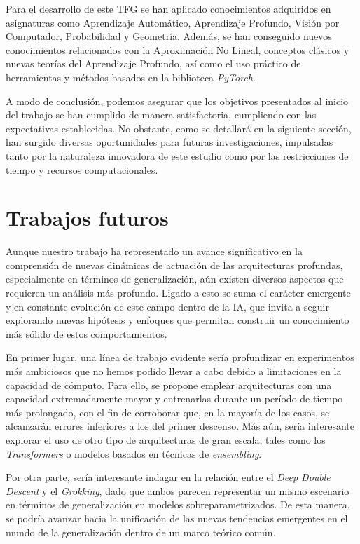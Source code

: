 Para el desarrollo de este TFG se han aplicado conocimientos adquiridos en asignaturas como Aprendizaje Automático, Aprendizaje Profundo, Visión por Computador, Probabilidad y Geometría. Además, se han conseguido nuevos conocimientos relacionados con la Aproximación No Lineal, conceptos clásicos y nuevas teorías del Aprendizaje Profundo, así como el uso práctico de herramientas y métodos basados en la biblioteca \textit{PyTorch}.

A modo de conclusión, podemos asegurar que los objetivos presentados al inicio del trabajo se han cumplido de manera satisfactoria, cumpliendo con las expectativas establecidas. No obstante, como se detallará en la siguiente sección, han surgido diversas oportunidades para futuras investigaciones, impulsadas tanto por la naturaleza innovadora de este estudio como por las restricciones de tiempo y recursos computacionales.

\chapter{Trabajos futuros}\label{ch:trabajos-futuros}

Aunque nuestro trabajo ha representado un avance significativo en la comprensión de nuevas dinámicas de actuación de las arquitecturas profundas, especialmente en términos de generalización, aún existen diversos aspectos que requieren un análisis más profundo. Ligado a esto se suma el carácter emergente y en constante evolución de este campo dentro de la IA, que invita a seguir explorando nuevas hipótesis y enfoques que permitan construir un conocimiento más sólido de estos comportamientos.

En primer lugar, una línea de trabajo evidente sería profundizar en experimentos más ambiciosos que no hemos podido llevar a cabo debido a limitaciones en la capacidad de cómputo. Para ello, se propone emplear arquitecturas con una capacidad extremadamente mayor y entrenarlas durante un período de tiempo más prolongado, con el fin de corroborar que, en la mayoría de los casos, se alcanzarán errores inferiores a los del primer descenso. Más aún, sería interesante explorar el uso de otro tipo de arquitecturas de gran escala, tales como los \textit{Transformers} o modelos basados en técnicas de \textit{ensembling}.

Por otra parte, sería interesante indagar en la relación entre el \textit{Deep Double Descent} y el \textit{Grokking}, dado que ambos parecen representar un mismo escenario en términos de generalización en modelos sobreparametrizados. De esta manera, se podría avanzar hacia la unificación de las nuevas tendencias emergentes en el mundo de la generalización dentro de un marco teórico común.

